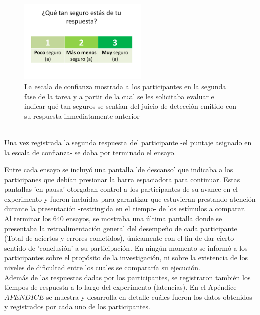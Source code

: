 \begin{itemize}
\begin{itemize}
\begin{figure}[th]
\centering
\includegraphics[width=0.55\textwidth]{Figures/Ejemplo_Escala}
\caption[Presentación de la escala de confianza]{La escala de confianza mostrada a los participantes en la segunda fase de la tarea y  a partir de la cual se les solicitaba evaluar e indicar qué tan seguros se sentían del juicio de detección emitido con su respuesta inmediatamente anterior}
\label{fig:Ejem_Esc}
\end{figure}\\

Una vez registrada la segunda respuesta del participante -el puntaje asignado en la escala de confianza- se daba por terminado el ensayo.\\

\end{itemize}

Entre cada ensayo se incluyó una pantalla 'de descanso' que indicaba a los participanes que debían presionar la barra espaciadora para continuar. Estas pantallas 'en pausa' otorgaban control a los participantes de su avance en el experimento y fueron incluídas para garantizar que estuvieran prestando atención durante la presentación -restringida en el tiempo- de los estímulos a comparar.\\

Al terminar los 640 ensayos, se mostraba una última pantalla donde se presentaba la retroalimentación general del desempeño de cada participante (Total de aciertos y errores cometidos), únicamente con el fin de dar cierto sentido de 'conclusión' a su participación. En ningún momento se informó a los participantes sobre el propósito de la investigación, ni sobre la existencia de los niveles de dificultad entre los cuales se compararía su ejecución.\\ 

Además de las respuestas dadas por los participantes, se registraron también los tiempos de respuesta a lo largo del experimento (latencias). En el Apéndice $APENDICE$ se muestra y desarrolla en detalle cuáles fueron los datos obtenidos y registrados por cada uno de los participantes.\\


\end{itemize}

